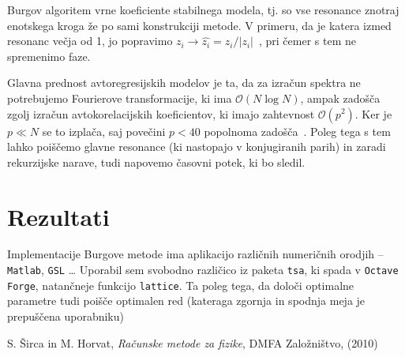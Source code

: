 \documentclass[a4 paper, 12pt]{article}
\begin{document}
Burgov algoritem vrne koeficiente stabilnega modela, tj. so vse resonance znotraj enotskega kroga
\v ze po sami konstrukciji metode. V primeru, da je katera izmed resonanc ve\v cja od 1, jo popravimo
$z_i \to \hat{z_i} = z_i/|z_i|$~\cite[str. 305]{sirca}, pri \v cemer s tem ne spremenimo faze.

Glavna prednost avtoregresijskih modelov je ta, da za izra\v cun spektra ne potrebujemo Fourierove transformacije,
ki ima $\mathcal{O}(N \log N)$, ampak zado\v s\v ca zgolj izra\v cun avtokorelacijskih koeficientov, ki imajo
zahtevnost $\mathcal{O}(p^2)$. Ker je $p \ll N$ se to izpla\v ca, saj pove\v cini $p < 40$ popolnoma
zado\v s\v ca~\cite[str. 309]{sirca}. Poleg tega s tem lahko poi\v s\v cemo glavne resonance (ki nastopajo v
konjugiranih parih) in zaradi rekurzijske narave, tudi napovemo \v casovni potek, ki bo sledil.

\section{Rezultati}
Implementacije Burgove metode ima aplikacijo razli\v cnih numeri\v cnih orodjih -- {\tt Matlab}, {\tt GSL} \ldots
Uporabil sem svobodno razli\v cico iz paketa {\tt tsa}, ki spada v {\tt Octave Forge}, natan\v cneje funkcijo {\tt lattice}.
Ta poleg tega, da dolo\v ci optimalne parametre tudi poi\v s\v ce optimalen red (kateraga zgornja in spodnja meja
je prepu\v s\v cena uporabniku)

\begin{thebibliography}{9}
		S. \v Sirca in M. Horvat,
		{\em Ra\v cunske metode za fizike},
		DMFA Zalo\v zni\v stvo,
		(2010)
\end{thebibliography}
\end{document}
